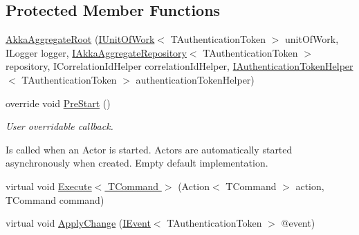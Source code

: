 \subsection*{Protected Member Functions}
\begin{DoxyCompactItemize}
\item 
\hyperlink{classCqrs_1_1Akka_1_1Domain_1_1AkkaAggregateRoot_a060f981e4c3023aec36e7c6f1cfb3a9d}{Akka\+Aggregate\+Root} (\hyperlink{interfaceCqrs_1_1Domain_1_1IUnitOfWork}{I\+Unit\+Of\+Work}$<$ T\+Authentication\+Token $>$ unit\+Of\+Work, I\+Logger logger, \hyperlink{interfaceCqrs_1_1Akka_1_1Domain_1_1IAkkaAggregateRepository}{I\+Akka\+Aggregate\+Repository}$<$ T\+Authentication\+Token $>$ repository, I\+Correlation\+Id\+Helper correlation\+Id\+Helper, \hyperlink{interfaceCqrs_1_1Authentication_1_1IAuthenticationTokenHelper}{I\+Authentication\+Token\+Helper}$<$ T\+Authentication\+Token $>$ authentication\+Token\+Helper)
\item 
override void \hyperlink{classCqrs_1_1Akka_1_1Domain_1_1AkkaAggregateRoot_a7da2d3a244e34717ec5af1db8f0042bc}{Pre\+Start} ()
\begin{DoxyCompactList}\small\item\em User overridable callback. 

Is called when an Actor is started. Actors are automatically started asynchronously when created. Empty default implementation. \end{DoxyCompactList}\item 
virtual void \hyperlink{classCqrs_1_1Akka_1_1Domain_1_1AkkaAggregateRoot_af8a9bd0e80498b3b54beb7cbec820533}{Execute$<$ T\+Command $>$} (Action$<$ T\+Command $>$ action, T\+Command command)
\item 
virtual void \hyperlink{classCqrs_1_1Akka_1_1Domain_1_1AkkaAggregateRoot_aaa135cb26be9e5353986f5611f05c059}{Apply\+Change} (\hyperlink{interfaceCqrs_1_1Events_1_1IEvent}{I\+Event}$<$ T\+Authentication\+Token $>$ @event)
\end{DoxyCompactItemize}
